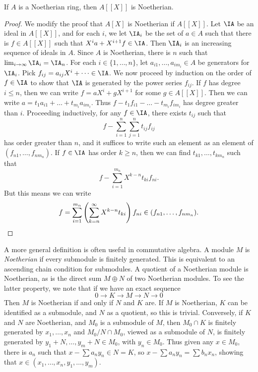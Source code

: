 \begin{theorem}
    If $A$ is a Noetherian ring, then $A[[X]]$ is Noetherian.
\end{theorem}
\begin{proof}
    We modify the proof that $A[X]$ is Noetherian if $A[[X]]$. Let $\IA$ be an ideal in $A[[X]]$, and for each $i$, we let $\IA_i$ be the set of $a \in A$ such that there is $f \in A[[X]]$ such that $X^i a + X^{i+1} f \in \IA$. Then $\IA_i$ is an increasing sequence of ideals in $A$. Since $A$ is Noetherian, there is $n$ such that $\lim_{i \to \infty} \IA_i = \IA_n$. For each $i \in \{ 1, \dots, n \}$, let $a_{i1}, \dots, a_{im_i} \in A$ be generators for $\IA_i$. Pick $f_{ij} = a_{ij}X^i + \dots \in \IA$. We now proceed by induction on the order of $f \in \IA$ to show that $\IA$ is generated by the power series $f_{ij}$. If $f$ has degree $i \leq n$, then we can write $f = aX^i + g X^{i+1}$ for some $g \in A[[X]]$. Then we can write $a = t_1 a_{i1} + \dots + t_{m_i} a_{im_i}$. Thus $f - t_1 f_{i1} - \dots - t_{m_i} f_{im_i}$ has degree greater than $i$. Proceeding inductively, for any $f \in \IA$, there exists $t_{ij}$ such that
    \[ f - \sum_{i = 1}^n \sum_{j = 1}^n t_{ij} f_{ij} \]
    has order greater than $n$, and it suffices to write such an element as an element of $(f_{n1}, \dots, f_{nm_n})$. If $f \in \IA$ has order $k \geq n$, then we can find $t_{k1},\dots,t_{km_n}$ such that
    \[ f - \sum_{i = 1}^{m_n} X^{k-n} t_{ki} f_{ni}. \]
    But this means we can write
    \[ f = \sum_{i = 1}^{m_n} \left( \sum_{k = n}^\infty X^{k-n} t_{ki} \right) f_{ni} \in (f_{n1}, \dots, f_{nm_n}). \qedhere \]
\end{proof}

A more general definition is often useful in commutative algebra. A module $M$ is \emph{Noetherian} if every submodule is finitely generated. This is equivalent to an ascending chain condition for submodules. A quotient of a Noetherian module is Noetherian, as is the direct sum $M \oplus N$ of two Noetherian modules. To see the latter property, we note that if we have an exact sequence
%
\[ 0 \to K \to M \to N \to 0 \]
%
Then $M$ is Noetherian if and only if $N$ and $K$ are. If $M$ is Noetherian, $K$ can be identified as a submodule, and $N$ as a quotient, so this is trivial. Conversely, if $K$ and $N$ are Noetherian, and $M_0$ is a submodule of $M$, then $M_0 \cap K$ is finitely generated by $x_1, \dots, x_n$ and $M_0/N \cap M_0$, viewed as a submodule of $N$, is finitely generated by $y_1 + N, \dots, y_m + N \in M_0$, with $y_n \in M_0$. Thus given any $x \in M_0$, there is $a_n$ such that $x - \sum a_ny_n \in N = K$, so $x - \sum a_ny_n = \sum b_nx_n$, showing that $x \in (x_1, \dots, x_n, y_1, \dots, y_m)$.

